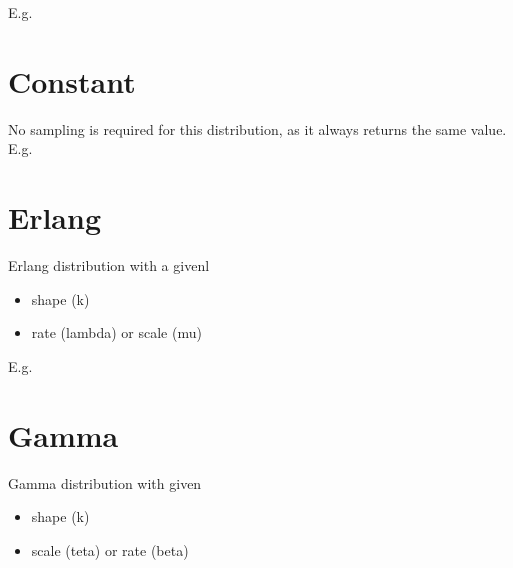 \documentclass[letterpaper,10pt,english]{sphinxmanual}
\begin{document}
E.g.

\begin{sphinxVerbatim}[commandchars=\\\{\}]
    
\end{sphinxVerbatim}


\section{Constant}
\label{\detokenize{Distributions:constant}}
No sampling is required for this distribution, as it always returns the same value. E.g.

\begin{sphinxVerbatim}[commandchars=\\\{\}]
  
\end{sphinxVerbatim}


\section{Erlang}
\label{\detokenize{Distributions:erlang}}
Erlang distribution with a givenl
\begin{itemize}
\item {} 
shape (k)

\item {} 
rate (lambda) or scale (mu)

\end{itemize}

E.g.

\begin{sphinxVerbatim}[commandchars=\\\{\}]
     
\end{sphinxVerbatim}


\section{Gamma}
\label{\detokenize{Distributions:gamma}}
Gamma distribution with given
\begin{itemize}
\item {} 
shape (k)

\item {} 
scale (teta) or rate (beta)

\end{itemize}
\end{document}
